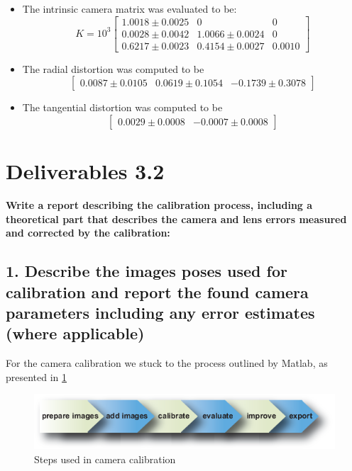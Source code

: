 \begin{itemize}
	
\item The intrinsic camera matrix was evaluated to be:
\begin{equation}
K = 10^3\begin{bmatrix}
1.0018 \pm 0.0025 & 0 & 0 \\
0.0028 \pm 0.0042 & 1.0066 \pm 0.0024 & 0 \\
0.6217 \pm 0.0023 & 0.4154 \pm 0.0027 & 0.0010
\end{bmatrix}
\end{equation}
\item The radial distortion was computed to be 
\begin{equation}
\begin{bmatrix}
0.0087 \pm 0.0105 & 0.0619 \pm 0.1054 & -0.1739 \pm 0.3078
\end{bmatrix}
\end{equation}
\item The tangential distortion was computed to be 
\begin{equation}
\begin{bmatrix}
0.0029 \pm 0.0008 & -0.0007 \pm 0.0008 \end{bmatrix}
\end{equation}
\end{itemize}

\section{Deliverables 3.2}
\textbf{Write a report describing the calibration process, including a theoretical part that describes the camera and lens errors measured and corrected by the calibration:}
\subsection*{1. Describe the images poses used for calibration and report the found camera parameters including any error estimates (where applicable)}
For the camera calibration we stuck to the process outlined by Matlab, as presented in \ref{fig:cameracalibratorappsteps}

\begin{figure}[ht!]
	\centering
	\includegraphics[width=0.7\linewidth]{graphics/cameracalibrator_app_steps}
	\caption{Steps used in camera calibration}
	\label{fig:cameracalibratorappsteps}
\end{figure}

